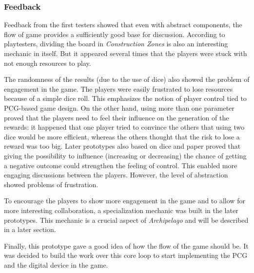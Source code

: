 \subsubsection{Feedback}
Feedback from the first testers showed that even with abstract components, the flow of game provides a sufficiently good base for discussion. According to playtesters, dividing the board in \textit{Construction Zones} is also an interesting mechanic in itself. But it appeared several times that the players were stuck with not enough resources to play.

The randomness of the results (due to the use of dice) also showed the problem of engagement in the game. The players were easily frustrated to lose resources because of a simple dice roll. This emphasizes the notion of player control tied to PCG-based game design. On the other hand, using more than one parameter proved that the players need to feel their influence on the generation of the rewards: it happened that one player tried to convince the others that using two dice would be more efficient, whereas the others thought that the risk to lose a reward was too big. Later prototypes also based on dice and paper proved that giving the possibility to influence (increasing or decreasing) the chance of getting a negative outcome could strengthen the feeling of control. This enabled more engaging discussions between the players. However, the level of abstraction showed problems of frustration.


To encourage the players to show more engagement in the game and to allow for more interesting collaboration, a specialization mechanic was built in the later prototypes. This mechanic is a crucial aspect of \textit{Archipelago} and will be described in a later section. 
 
Finally, this prototype gave a good idea of how the flow of the game should be. It was decided to build the work over this core loop to start implementing the PCG and the digital device in the game.


